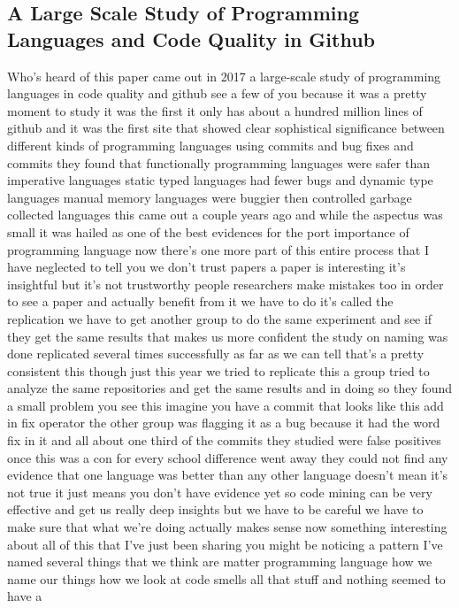 \documentclass[conference, compsoc, twoside]{IEEEtran}
\begin{document}
\subsection{A Large Scale Study of Programming Languages and Code Quality in Github}
Who's heard of this paper came out in 2017 a large-scale study of programming languages in code quality and github see
a few of you because it was a pretty
moment to study it was the first it only
has about a hundred million lines of
github and it was the first site that
showed clear sophistical significance
between different kinds of programming
languages using commits and bug fixes
and commits they found that functionally
programming languages were safer than
imperative languages static typed
languages had fewer bugs and dynamic
type languages manual memory languages
were buggier then controlled garbage
collected languages this came out a
couple years ago and while the aspectus
was small it was hailed as one of the
best evidences for the port importance
of programming language now there's one
more part of this entire process that I
have neglected to tell you we don't
trust papers a paper is interesting it's
insightful but it's not trustworthy
people researchers make mistakes too in
order to see a paper and actually
benefit from it we have to do it's
called the replication we have to get
another group to do the same experiment
and see if they get the same results
that makes us more confident the study
on naming was done replicated several
times successfully as far as we can tell
that's a pretty consistent
this though just this year we tried to
replicate this a group tried to analyze
the same repositories and get the same
results and in doing so they found a
small problem you see this
imagine you have a commit that looks
like this add in fix operator the other
group was flagging it as a bug because
it had the word fix in it and all about
one third of the commits they studied
were false positives once this was a con
for every school difference went away
they could not find any evidence that
one language was better than any other
language doesn't mean it's not true it
just means you don't have evidence yet
so code mining can be very effective and
get us really deep insights but we have
to be careful we have to make sure that
what we're doing actually makes sense
now something interesting about all of
this that I've just been sharing you
might be noticing a pattern I've named
several things that we think are matter
programming language how we name our
things how we look at code smells all
that stuff and nothing seemed to have a
\end{document}
